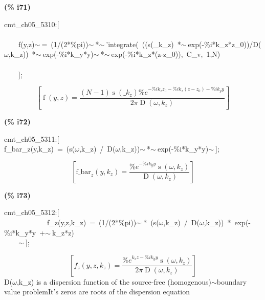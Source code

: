 \documentclass[fleqn]{article}
\begin{document}
\noindent
\begin{minipage}[t]{4.000000em}\color{red}\bfseries
(\% i71)	
\end{minipage}
\begin{minipage}[t]{\textwidth}\color{blue}
cmt\_ch05\_5310:[\\
\\
\ \ \ \ f(y,z)\ensuremath{\sim\ }=\ (1/(2*\%pi))\ensuremath{\sim\ }*\ensuremath{\sim\ }'integrate(\ ((s(\_k\_z)\ *\ensuremath{\sim\ }exp(-\%i*k\_z*z\_0))/D(\ensuremath{\omega},k\_z))\ *\ensuremath{\sim\ }exp(-\%i*k\_y*y)\ensuremath{\sim\ }*\ensuremath{\sim\ }exp(-\%i*k\_z*(z-z\_0)),\ C\_v,\ 1,N)\\
\ \ \ \ \\
\ \ \ \ ];
\end{minipage}
\[\displaystyle \tag{\% o71} 
\left[ \operatorname{f}\left( y\operatorname{,}z\right) =\frac{\left( N-1\right)  \operatorname{s}\left( {{\_ k}_z}\right)  {{\% e}^{-\% i {k_z} {z_0}-\% i {k_z} \left( z-{z_0}\right) -\% i {k_y} y}}}{2 \ensuremath{\pi}  \operatorname{D}\left( \omega \operatorname{,}{k_z}\right) }\right] \mbox{}
\]


\noindent
\begin{minipage}[t]{4.000000em}\color{red}\bfseries
(\% i72)	
\end{minipage}
\begin{minipage}[t]{\textwidth}\color{blue}
cmt\_ch05\_5311:[\\
f\_bar\_z(y,k\_z)\ =\ (s(\ensuremath{\omega},k\_z)\ /\ D(\ensuremath{\omega},k\_z))\ensuremath{\sim\ }*\ensuremath{\sim\ }exp(-\%i*k\_y*y)\ensuremath{\sim\ }];
\end{minipage}
\[\displaystyle \tag{\% o72} 
\left[ {{\ensuremath{\mathrm{f\_ bar}}}_z}\left( y\operatorname{,}{k_z}\right) =\frac{{{\% e}^{-\% i {k_y} y}} \operatorname{s}\left( \omega \operatorname{,}{k_z}\right) }{\operatorname{D}\left( \omega \operatorname{,}{k_z}\right) }\right] \mbox{}
\]


\noindent
\begin{minipage}[t]{4.000000em}\color{red}\bfseries
(\% i73)	
\end{minipage}
\begin{minipage}[t]{\textwidth}\color{blue}
cmt\_ch05\_5312:[\ \\
\ \ \ \ \ \ \ \ \ \ \ \ f\_z(y,z,k\_z)\ =\ (1/(2*\%pi))\ensuremath{\sim\ }*\ (s(\ensuremath{\omega},k\_z)\ /\ D(\ensuremath{\omega},k\_z))\ *\ exp(-\%i*k\_y*y\ +\ensuremath{\sim\ }k\_z*z)\ \\
\ \ \ \ \ensuremath{\sim\ }];
\end{minipage}
\[\displaystyle \tag{\% o73} 
\left[ {f_z}\left( y\operatorname{,}z\operatorname{,}{k_z}\right) =\frac{{{\% e}^{{k_z} z-\% i {k_y} y}} \operatorname{s}\left( \omega \operatorname{,}{k_z}\right) }{2 \ensuremath{\pi}  \operatorname{D}\left( \omega \operatorname{,}{k_z}\right) }\right] \mbox{}
\]
D(\ensuremath{\omega},k\_z) is a dispersion function of the source-free (homogenous)\ensuremath{\sim }boundary value problemIt's zeros are roots of the dispersion equation
\end{document}
